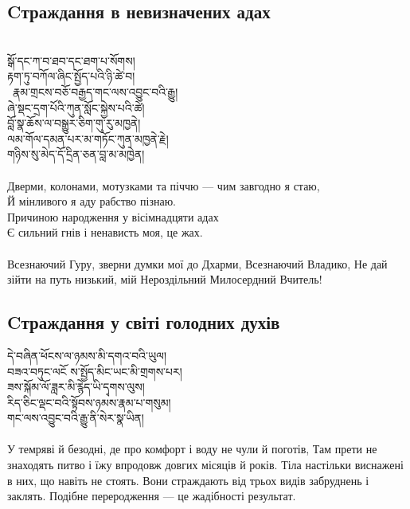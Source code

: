 \subsection*{Cтраждання в невизначених адах}
\\
\ti
སྒོ་དང་ཀ་བ་ཐབ་དང་ཐག་པ་སོགས།\\
རྟག་ཏུ་བཀོལ་ཞིང་སྤྱོད་པའི་ཉི་ཚེ་བ། \\\
རྣམ་གྲངས་བཅོ་བརྒྱད་གང་ལས་འབྱུང་བའི་རྒྱུ། \\
ཞེ་སྡང་དྲག་པོའི་ཀུན་སློང་སྐྱེས་པའི་ཚེ། \\
བློ་སྣ་ཆོས་ལ་བསྒྱུར་ཅིག་གུ་རུ་མཁྱནེ། \\
ལམ་གོལ་དམན་པར་མ་གཏོང་ཀུན་མཁྱནེ་རྗེ། \\
གཉིས་སུ་མེད་དོ་དྲིན་ཅན་བླ་མ་མཁྱེན།\\
\\
\ru
Дверми, колонами, мотузками та піччю --- чим завгодно я стаю,\\
Й мінливого я аду рабство пізнаю.\\
Причиною народження у вісімнадцяти адах\\
Є сильний гнів і ненависть моя, це жах.\\
\\
Всезнаючий Гуру, зверни думки мої до Дхарми, Всезнаючий Владико,
Не дай зійти на путь низький, мій Нероздільний Милосердний Вчитель!\\

\newpage
\subsection*{Cтраждання у світі голодних духів}
\ti
དེ་བཞིན་ཕོངས་ལ་ཉམས་མི་དགའ་བའི་ཡུལ།\\
བཟའ་བཏུང་ལངོ ས་སྤྱོད་མིང་ཡང་མི་གྲགས་པར། \\
ཟས་སྐོམ་ལོ་ཟླར་མི་རྙེད་ཡི་དྭགས་ལུས། \\
རིད་ཅིང་ལྡང་བའི་སྟོབས་ཉམས་རྣམ་པ་གསུམ། \\
གང་ལས་འབྱུང་བའི་རྒྱུ་ནི་སེར་སྣ་ཡིན།\\
\\
\ru
У темряві й безодні, де про комфорт і воду не чули й поготів,
Там прети не знаходять питво і їжу впродовж довгих місяців й років.
Тіла настільки виснажені в них, що навіть не стоять.
Вони страждають від трьох видів забруднень і заклять.
Подібне переродження --- це жадібності результат.

